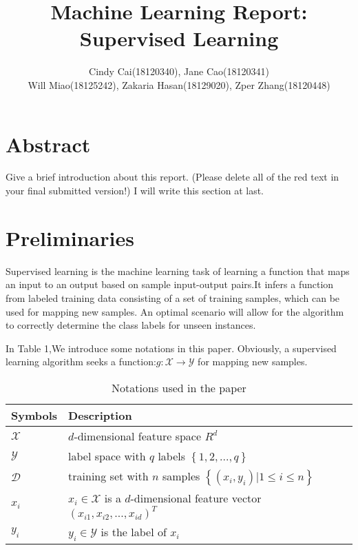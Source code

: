 \documentclass[11pt]{article}
\author{Cindy Cai(18120340), Jane Cao(18120341) \\ Will Miao(18125242), Zakaria Hasan(18129020), Zper Zhang(18120448)}   %
\title{\textbf{Machine Learning Report: Supervised Learning}}
\date{}
\begin{document}
\maketitle

\section{Abstract}
{\color{red} Give a brief introduction about this report. (Please delete all of the red text in your final submitted version!)}
{\color{green} I will write this section at last.}

\section{Preliminaries}

Supervised learning is the machine learning task of learning a function that maps an input to an output based on sample input-output pairs.It infers a function from labeled training data consisting of a set of training samples, which can be used for mapping new samples. An optimal scenario will allow for the algorithm to correctly determine the class labels for unseen instances.

In Table 1,We introduce some notations in this paper. Obviously, a supervised learning algorithm seeks a function:$g: \mathcal{X} \to \mathcal{Y}$ for mapping new samples.

\begin{table}[h]
	\caption{Notations used in the paper}\label{Notations}
	\centering
	\small
	\begin{tabular}{lp{}}
		\hline
		Symbols & Description \\
		\hline
		\hline
	    {$\mathcal{X}$} & $d$-dimensional feature space $R^{d}$\\
	    {$\mathcal{Y}$} & label space with $q$ labels $\left\{1,2,...,q\right\}$\\
		{$\mathcal{D}$} & training set with $n$ samples $\left\{(x_{i}, y_{i})|1 \leq i \leq n\right\}$\\
		{$x_{i}$}       & $x_{i} \in \mathcal{X}$ is a $d$-dimensional feature vector$(x_{i1},x_{i2},...,x_{id})^{T}$\\
		{$y_{i}$}       & $y_{i} \in \mathcal{Y}$ is the label of $x_{i}$\\
		\hline	
	\end{tabular}
\end{table}
\end{document}
